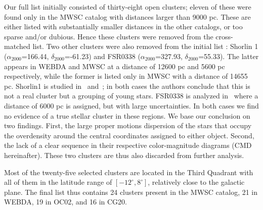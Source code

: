 \documentclass[draft]{aa}
\begin{document}
 Our full list initially consisted of thirty-eight open clusters; eleven of
 these were found only in the MWSC catalog with distances larger than 9000 pc.
 These are either listed with substantially smaller distances in the other
 catalogs, or too sparse and/or dubious. Hence these clusters were removed from
 the cross-matched list.
 Two other clusters were also removed from the initial list : Shorlin 1 
 ($\alpha_{2000}$=166.44, $\delta_{2000}$=-61.23) and FSR0338
 ($\alpha_{2000}$=327.93, $\delta_{2000}$=55.33). The latter appears in WEBDA and
 MWSC at a distance of 12600 pc and 5600 pc respectively, while the former is
 listed only in MWSC with a distance of 14655 pc. Shorlin1 is studied
 in~\cite{Carraro_2009} and~\cite{Turner_2012}; in both cases the authors
 conclude that this is not a real cluster but a grouping of young stars.
 FSR0338 is analyzed in~\cite{Froebrich_2010} where a distance of 6000 pc is
 assigned, but with large uncertainties.
 In both cases we find no evidence of a true stellar cluster in these regions.
 We base our conclusion on two findings. First, the large proper motions
 dispersion of the stars that occupy the overdensity around the central
 coordinates assigned to either object. Second, the lack of a clear sequence in
 their respective color-magnitude diagrams (CMD hereinafter). These two clusters
 are thus also discarded from further analysis.

 Most of the twenty-five selected clusters are located in the Third Quadrant
 with all of them in the latitude range of $\left[-12^{\circ}, 8^{\circ}\right]$,
 relatively close to the galactic plane. The final list thus contains 24
 clusters present in the MWSC catalog, 21 in WEBDA, 19 in OC02, and 16 in
 CG20.\\
\end{document}
